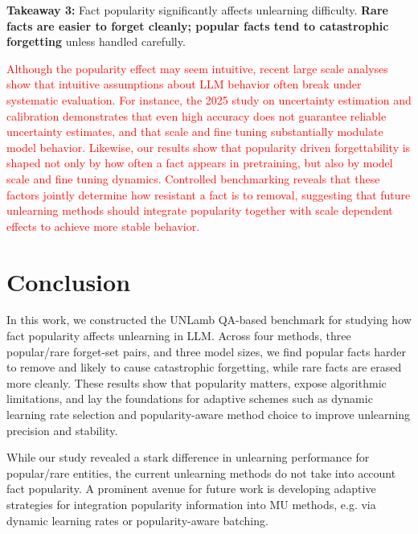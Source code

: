 \documentclass[11pt]{article}
\begin{document}
{\begin{tcolorbox}[colback=gray!10, colframe=black!50, 
  boxrule=0.5pt, arc=3pt, left=6pt, right=6pt, top=4pt, bottom=4pt]
\textbf{Takeaway 3:} Fact popularity significantly affects unlearning difficulty. \textbf{Rare facts are easier to forget cleanly; popular facts tend to catastrophic forgetting }unless handled carefully.
\end{tcolorbox}

\textcolor{red}{
Although the popularity effect may seem intuitive, recent large scale analyses show that intuitive assumptions about LLM behavior often break under systematic evaluation. For instance, the 2025 study on uncertainty estimation and calibration \cite{tao2025revisiting} demonstrates that even high accuracy does not guarantee reliable uncertainty estimates, and that scale and fine tuning substantially modulate model behavior. Likewise, our results show that popularity driven forgettability is shaped not only by how often a fact appears in pretraining, but also by model scale and fine tuning dynamics. Controlled benchmarking reveals that these factors jointly determine how resistant a fact is to removal, suggesting that future unlearning methods should integrate popularity together with scale dependent effects to achieve more stable behavior.
}



\section{Conclusion}
In this work, we constructed the UNLamb QA-based benchmark  for  studying how fact popularity affects unlearning in LLM. Across four methods, three popular/rare forget-set pairs, and three model sizes, we find popular facts harder to remove and likely to cause catastrophic forgetting, while rare facts are erased more cleanly. These results show that popularity matters, expose algorithmic limitations, and lay the foundations for adaptive schemes such as dynamic learning rate selection and popularity-aware method choice to improve unlearning precision and stability.

While our study revealed a stark difference in unlearning performance for popular/rare entities, the current unlearning methods do not take into account fact popularity. %
A prominent avenue for future work is developing adaptive strategies for integration popularity information into MU methods,  e.g. via dynamic learning rates or popularity-aware batching. %

}
\end{document}

